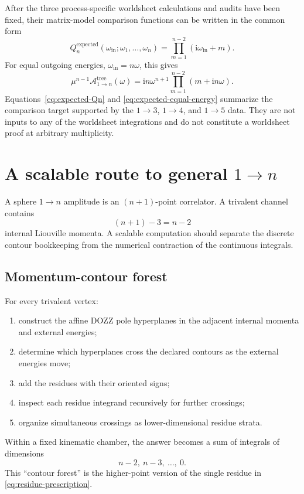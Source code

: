 \documentclass[11pt]{article}
\newcommand{\ii}{\mathrm{i}}
\newcommand{\A}{\mathcal{A}}
\begin{document}
After the three process-specific worldsheet calculations and audits have been
fixed, their matrix-model comparison functions can be written in the common
form
\begin{equation}
  \boxed{
  Q_n^{\mathrm{expected}}
  (\omega_{\mathrm{in}};\omega_1,\ldots,\omega_n)
  =\prod_{m=1}^{n-2}(\ii\omega_{\mathrm{in}}+m).}
  \label{eq:expected-Qn}
\end{equation}
For equal outgoing energies, $\omega_{\mathrm{in}}=n\omega$, this gives
\begin{equation}
  \boxed{
  \mu^{n-1}\A^{\mathrm{tree}}_{1\to n}(\omega)
  =\ii n\omega^{n+1}
   \prod_{m=1}^{n-2}(m+\ii n\omega).}
  \label{eq:expected-equal-energy}
\end{equation}
Equations~\eqref{eq:expected-Qn} and
\eqref{eq:expected-equal-energy} summarize the comparison target supported by
the $1\to3$, $1\to4$, and $1\to5$ data.  They are not inputs to any of the
worldsheet integrations and do not constitute a worldsheet proof at arbitrary
multiplicity.

\section{A scalable route to general \texorpdfstring{$1\to n$}{1 to n}}

A sphere $1\to n$ amplitude is an $(n+1)$-point correlator.  A trivalent
channel contains
\begin{equation}
  (n+1)-3=n-2
\end{equation}
internal Liouville momenta.  A scalable computation should separate the
discrete contour bookkeeping from the numerical contraction of the
continuous integrals.

\subsection{Momentum-contour forest}

For every trivalent vertex:
\begin{enumerate}
  \item construct the affine DOZZ pole hyperplanes in the adjacent internal
  momenta and external energies;
  \item determine which hyperplanes cross the declared contours as the
  external energies move;
  \item add the residues with their oriented signs;
  \item inspect each residue integrand recursively for further crossings;
  \item organize simultaneous crossings as lower-dimensional residue
  strata.
\end{enumerate}
Within a fixed kinematic chamber, the answer becomes a sum of integrals of
dimensions
\begin{equation}
  n-2,\ n-3,\ \ldots,\ 0.
\end{equation}
This ``contour forest'' is the higher-point version of the single residue in
\eqref{eq:residue-prescription}.
\end{document}
